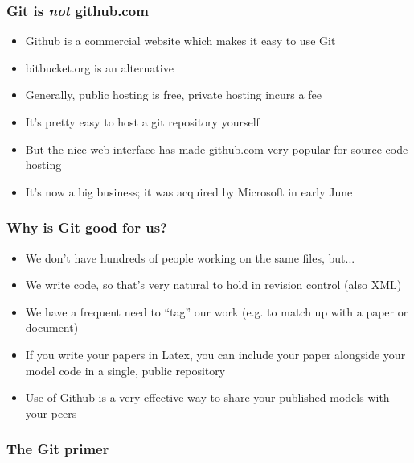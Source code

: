\documentclass{beamer}
\begin{document}
\begin{frame}
  \frametitle{Git is \emph{not} github.com}
  \begin{itemize}
  \item Github is a commercial website which makes it easy to use Git
  \item bitbucket.org is an alternative
  \pause \item Generally, public hosting is free, private hosting
  incurs a fee
  \pause \item It's pretty easy to host a git repository yourself
  \pause \item But the nice web interface has made github.com very
  popular for source code hosting
  \pause \item It's now a big business; it was acquired by Microsoft in early June
  \end{itemize}
\end{frame}

\begin{frame}
  \frametitle{Why is Git good for us?}
  \begin{itemize}
  \item We don't have hundreds of people working on the same files, but...
    \pause \item We write code, so that's very natural to hold in
    revision control (also XML)
    \pause \item We have a frequent need to ``tag'' our work (e.g. to
    match up with a paper or document)
    \pause \item If you write your papers in Latex, you can include
    your paper alongside your model code in a single, public
    repository
    \pause \item Use of Github is a very effective way to share your published models with
    your peers

  \end{itemize}
\end{frame}

\begin{frame}
  \frametitle{The Git primer}
\end{frame}

\begin{frame}
  \frametitle{}
\end{frame}

\begin{frame}
  \frametitle{}
\end{frame}
\end{document}

